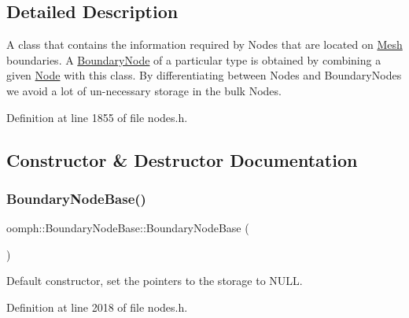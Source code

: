 \subsection{Detailed Description}
A class that contains the information required by Nodes that are located on \hyperlink{classoomph_1_1Mesh}{Mesh} boundaries. A \hyperlink{classoomph_1_1BoundaryNode}{Boundary\+Node} of a particular type is obtained by combining a given \hyperlink{classoomph_1_1Node}{Node} with this class. By differentiating between Nodes and Boundary\+Nodes we avoid a lot of un-\/necessary storage in the bulk Nodes. 

Definition at line 1855 of file nodes.\+h.



\subsection{Constructor \& Destructor Documentation}
\mbox{\label{classoomph_1_1BoundaryNodeBase_a00957868c82b2ec9f676ebdd80f2edf4}} 
\subsubsection{\texorpdfstring{Boundary\+Node\+Base()}{BoundaryNodeBase()}\hspace{0.1cm}{\footnotesize\ttfamily [1/2]}}
{\footnotesize\ttfamily oomph\+::\+Boundary\+Node\+Base\+::\+Boundary\+Node\+Base (\begin{DoxyParamCaption}{ }\end{DoxyParamCaption})\hspace{0.3cm}{\ttfamily [inline]}}



Default constructor, set the pointers to the storage to N\+U\+LL. 



Definition at line 2018 of file nodes.\+h.

\mbox{\label{classoomph_1_1BoundaryNodeBase_acb698db0bafda5e858856d4106614059}} 
